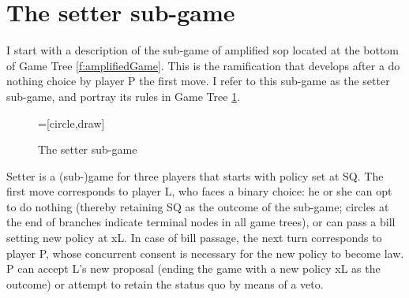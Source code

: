 \section{The setter sub-game}

I start with a description of the sub-game of amplified sop located at the bottom of Game Tree \ref{f:amplifiedGame}.  This is the ramification that develops after a do nothing choice by player P the first move.  I refer to this sub-game as the setter sub-game, and portray its rules in Game Tree \ref{f:setterGame}.  

\begin{figure}
  \begin{center}
    =[circle,draw]
    \caption{The setter sub-game}\label{f:setterGame}
  \end{center}
\end{figure}

Setter is a (sub-)game for three players that starts with policy set at SQ.  The first move corresponds to player L, who faces a binary choice: he or she can opt to do nothing (thereby retaining SQ as the outcome of the sub-game; circles at the end of branches indicate terminal nodes in all game trees), or can pass a bill setting new policy at xL.  In case of bill passage, the next turn corresponds to player P, whose concurrent consent is necessary for the new policy to become law.  P can accept L's new proposal (ending the game with a new policy xL as the outcome) or attempt to retain the status quo by means of a veto. 

